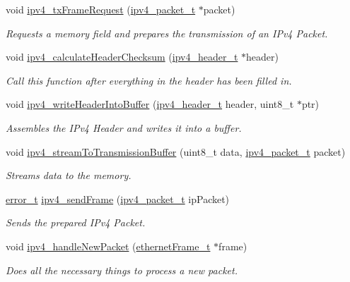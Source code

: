 \begin{DoxyCompactItemize}
\item 
void \mbox{\hyperlink{group__ipv4_ga1bf24e45bf60a70b43ea1f1738c9a4c5}{ipv4\+\_\+tx\+Frame\+Request}} (\mbox{\hyperlink{group__ipv4_ga68ea36d252d9332fd5e37d9aaedd06af}{ipv4\+\_\+packet\+\_\+t}} $\ast$packet)
\begin{DoxyCompactList}\small\item\em Requests a memory field and prepares the transmission of an I\+Pv4 Packet. \end{DoxyCompactList}\item 
void \mbox{\hyperlink{group__ipv4_gabf86b43adee57be777cf22f4cddc0b38}{ipv4\+\_\+calculate\+Header\+Checksum}} (\mbox{\hyperlink{group__ipv4_gaf4f2c6743b9fb1ea3c69734612ce41de}{ipv4\+\_\+header\+\_\+t}} $\ast$header)
\begin{DoxyCompactList}\small\item\em Call this function after everything in the header has been filled in. \end{DoxyCompactList}\item 
void \mbox{\hyperlink{group__ipv4_gacfb15ed3a5d68caffefbb0605e94b61d}{ipv4\+\_\+write\+Header\+Into\+Buffer}} (\mbox{\hyperlink{group__ipv4_gaf4f2c6743b9fb1ea3c69734612ce41de}{ipv4\+\_\+header\+\_\+t}} header, uint8\+\_\+t $\ast$ptr)
\begin{DoxyCompactList}\small\item\em Assembles the I\+Pv4 Header and writes it into a buffer. \end{DoxyCompactList}\item 
void \mbox{\hyperlink{group__ipv4_ga9b32058fa6f24f692e0915345b3373b2}{ipv4\+\_\+stream\+To\+Transmission\+Buffer}} (uint8\+\_\+t data, \mbox{\hyperlink{group__ipv4_ga68ea36d252d9332fd5e37d9aaedd06af}{ipv4\+\_\+packet\+\_\+t}} packet)
\begin{DoxyCompactList}\small\item\em Streams data to the memory. \end{DoxyCompactList}\item 
\mbox{\hyperlink{group__error_gad3ae44be85fe6952dcaed425499e8f6b}{error\+\_\+t}} \mbox{\hyperlink{group__ipv4_ga1837c9c3c1856f57fe1d5ec5008015a2}{ipv4\+\_\+send\+Frame}} (\mbox{\hyperlink{group__ipv4_ga68ea36d252d9332fd5e37d9aaedd06af}{ipv4\+\_\+packet\+\_\+t}} ip\+Packet)
\begin{DoxyCompactList}\small\item\em Sends the prepared I\+Pv4 Packet. \end{DoxyCompactList}\item 
void \mbox{\hyperlink{group__ipv4_ga7f96d526bafe55783b675597634d87ae}{ipv4\+\_\+handle\+New\+Packet}} (\mbox{\hyperlink{group__ethernet_ga7519a7ae14b490659069435698d28a25}{ethernet\+Frame\+\_\+t}} $\ast$frame)
\begin{DoxyCompactList}\small\item\em Does all the necessary things to process a new packet. \end{DoxyCompactList}\end{DoxyCompactItemize}


